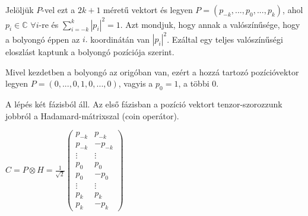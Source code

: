 Jelöljük $P$-vel ezt a $2k+1$ méretű vektort és legyen $P=(p_{-k},...,p_0,...,p_{k})$,
ahol $p_i\in\mathds{C}$ $\forall i$-re és $\sum\limits_{i=-k}^{k}|p_i|^2 = 1$. Azt mondjuk, hogy
annak a valószínűsége, hogy a bolyongó éppen az $i.$ koordinátán van $|p_i|^2$. Ezáltal egy
teljes valószínűségi eloszlást kaptunk a bolyongó pozíciója szerint.

Mivel kezdetben a bolyongó az origóban van, ezért a hozzá tartozó pozícióvektor legyen
$P = (0,...,0,1,0,...,0)$, vagyis a $p_0=1$, a többi $0$.

A lépés két fázisból áll. Az első fázisban a pozíció vektort
tenzor-szorozzunk jobbról a Hadamard-mátrixszal (coin operátor).

$C = P \otimes H = \frac{1}{\sqrt{2}}\begin{pmatrix}
    p_{-k} & p_{-k}  \\
    p_{-k} & -p_{-k} \\
    \vdots & \vdots  \\
    p_{0}  & p_{0}   \\
    p_{0}  & -p_{0}  \\
    \vdots & \vdots  \\
    p_{k}  & p_{k}   \\
    p_{k}  & -p_{k}
  \end{pmatrix}
$

